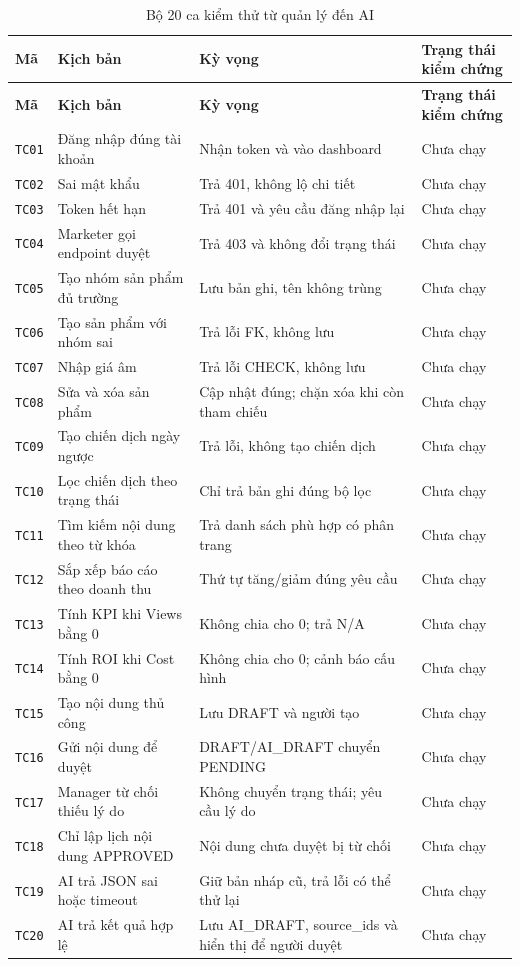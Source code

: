 \begingroup
\scriptsize
\setlength{\LTleft}{0pt}
\setlength{\LTright}{0pt}
\begin{longtable}{|C{0.9cm}|L{4.5cm}|L{5.3cm}|C{1.5cm}|}
\caption{Bộ 20 ca kiểm thử từ quản lý đến AI}\label{tab:test20-v4}\\
\hline
\textbf{Mã} & \textbf{Kịch bản} & \textbf{Kỳ vọng} & \textbf{Trạng thái kiểm chứng}\\
\hline\endfirsthead
\hline
\textbf{Mã} & \textbf{Kịch bản} & \textbf{Kỳ vọng} & \textbf{Trạng thái kiểm chứng}\\
\hline\endhead
\texttt{TC01} & Đăng nhập đúng tài khoản & Nhận token và vào dashboard & Chưa chạy\\\hline
\texttt{TC02} & Sai mật khẩu & Trả 401, không lộ chi tiết & Chưa chạy\\\hline
\texttt{TC03} & Token hết hạn & Trả 401 và yêu cầu đăng nhập lại & Chưa chạy\\\hline
\texttt{TC04} & Marketer gọi endpoint duyệt & Trả 403 và không đổi trạng thái & Chưa chạy\\\hline
\texttt{TC05} & Tạo nhóm sản phẩm đủ trường & Lưu bản ghi, tên không trùng & Chưa chạy\\\hline
\texttt{TC06} & Tạo sản phẩm với nhóm sai & Trả lỗi FK, không lưu & Chưa chạy\\\hline
\texttt{TC07} & Nhập giá âm & Trả lỗi CHECK, không lưu & Chưa chạy\\\hline
\texttt{TC08} & Sửa và xóa sản phẩm & Cập nhật đúng; chặn xóa khi còn tham chiếu & Chưa chạy\\\hline
\texttt{TC09} & Tạo chiến dịch ngày ngược & Trả lỗi, không tạo chiến dịch & Chưa chạy\\\hline
\texttt{TC10} & Lọc chiến dịch theo trạng thái & Chỉ trả bản ghi đúng bộ lọc & Chưa chạy\\\hline
\texttt{TC11} & Tìm kiếm nội dung theo từ khóa & Trả danh sách phù hợp có phân trang & Chưa chạy\\\hline
\texttt{TC12} & Sắp xếp báo cáo theo doanh thu & Thứ tự tăng/giảm đúng yêu cầu & Chưa chạy\\\hline
\texttt{TC13} & Tính KPI khi Views bằng 0 & Không chia cho 0; trả N/A & Chưa chạy\\\hline
\texttt{TC14} & Tính ROI khi Cost bằng 0 & Không chia cho 0; cảnh báo cấu hình & Chưa chạy\\\hline
\texttt{TC15} & Tạo nội dung thủ công & Lưu DRAFT và người tạo & Chưa chạy\\\hline
\texttt{TC16} & Gửi nội dung để duyệt & DRAFT/AI\_DRAFT chuyển PENDING & Chưa chạy\\\hline
\texttt{TC17} & Manager từ chối thiếu lý do & Không chuyển trạng thái; yêu cầu lý do & Chưa chạy\\\hline
\texttt{TC18} & Chỉ lập lịch nội dung APPROVED & Nội dung chưa duyệt bị từ chối & Chưa chạy\\\hline
\texttt{TC19} & AI trả JSON sai hoặc timeout & Giữ bản nháp cũ, trả lỗi có thể thử lại & Chưa chạy\\\hline
\texttt{TC20} & AI trả kết quả hợp lệ & Lưu AI\_DRAFT, source\_ids và hiển thị để người duyệt & Chưa chạy\\\hline
\end{longtable}
\endgroup


